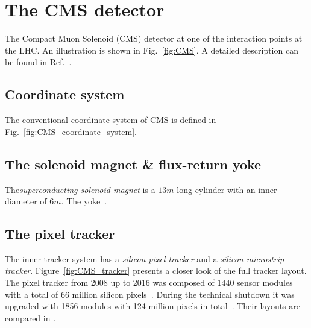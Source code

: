 \section{The CMS detector}



The Compact Muon Solenoid (CMS) detector at one of the interaction points at the LHC.
An illustration is shown in Fig.~\ref{fig:CMS}.
A detailed description can be found in Ref.~\cite{CMS}.

\subsection{Coordinate system}
The conventional coordinate system of CMS is defined in Fig.~\ref{fig:CMS_coordinate_system}.



\subsection{The solenoid magnet \& flux-return yoke}
The\emph{superconducting solenoid magnet} is a $13\unit{m}$ long cylinder with an inner diameter of $6\unit{m}$.
The yoke~\cite{CMS_yoke}.

\subsection{The pixel tracker}
The inner tracker system has a \emph{silicon pixel tracker} and a \emph{silicon microstrip tracker}. Figure~\ref{fig:CMS_tracker} presents a closer look of the full tracker layout.
The pixel tracker from 2008 up to 2016 was composed of $1440$ sensor modules with a total of $66$ million silicon pixels~\cite{CMS_vertex}.
During the technical shutdown it was upgraded with 1856 modules with 124 million pixels in total~\cite{CMS_pixel_Phase1_2017,CMS_pixel_Phase1_2021}.
Their layouts are compared in .

